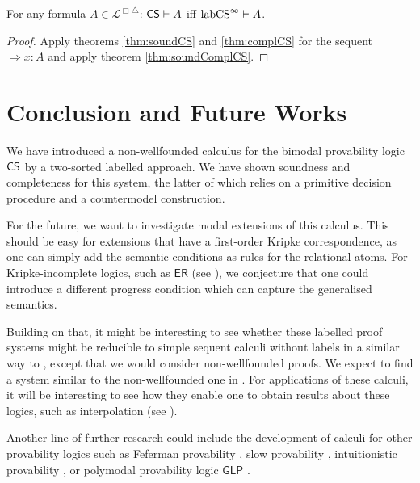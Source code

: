 \documentclass[runningheads,orivec]{llncs}
\newcommand{\CS}{\textnormal{\textsf{CS}}}
\newcommand{\ER}{\mathsf{ER}}
\newcommand{\GLP}{\mathsf{GLP}}
\newcommand{\labCS}{{\textnormal{labCS}^\infty}}
\newcommand{\Ra}{\Rightarrow}
\newcommand{\La}{\mathcal{L}}
\newcommand{\LaBi}{\La^{\Box \triangle}}
\begin{document}
\begin{corollary}
    For any formula $A \in \LaBi$: $\CS \vdash A$ iff $\labCS \vdash A$.
\end{corollary}
\begin{proof}
    Apply theorems \ref{thm:soundCS} and \ref{thm:complCS} for the sequent $\Ra x: A$ and apply theorem \ref{thm:soundComplCS}.
\end{proof}

\section{Conclusion and Future Works}\label{sec:concl}
We have introduced a non-wellfounded calculus for the bimodal provability logic $\CS$ by a two-sorted labelled approach. We have shown soundness and completeness for this system, the latter of which relies on a primitive decision procedure and a countermodel construction. 

For the future, we want to investigate modal extensions of this calculus. This should be easy for extensions that have a first-order Kripke correspondence, as one can simply add the semantic conditions as rules for the relational atoms. 
For Kripke-incomplete logics, such as $\ER$ (see \cite{Carlson86,Visser95}), we conjecture that one could introduce a different progress condition which can capture the generalised semantics.

Building on that, it might be interesting to see whether these labelled proof systems might be reducible to simple sequent calculi without labels in a similar way to \cite{Lyon_2025,Pimentel19}, except that we would consider non-wellfounded proofs. We expect to find a system similar to the non-wellfounded one in \cite{Shamkanov14}.
For applications of these calculi, it will be interesting to see how they enable one to obtain results about these logics, such as interpolation (see \cite{Afsharietal_2021,Shamkanov14}).

Another line of further research could include the development of calculi for other provability logics such as Feferman provability \cite{Feferman60,Shavrukov94,Visser89}, slow provability \cite{Henk16}, intuitionistic provability \cite{Ardeshir18}, or polymodal provability logic $\GLP$ \cite{Japaridze85}.



\end{document}
